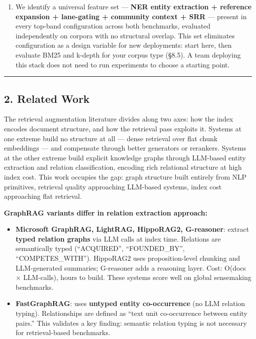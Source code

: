 \begin{enumerate}
\item
  We identify a universal feature set --- \textbf{NER entity extraction + reference expansion + lane-gating + community context + SRR} --- present in every top-band configuration across both benchmarks, evaluated independently on corpora with no structural overlap. This set eliminates configuration as a design variable for new deployments: start here, then evaluate BM25 and k-depth for your corpus type (§8.5). A team deploying this stack does not need to run experiments to choose a starting point.
\end{enumerate}

\begin{center}\rule{0.5\linewidth}{0.5pt}\end{center}

\subsection{2. Related Work}\label{related-work}

The retrieval augmentation literature divides along two axes: how the index encodes document structure, and how the retrieval pass exploits it. Systems at one extreme build no structure at all --- dense retrieval over flat chunk embeddings --- and compensate through better generators or rerankers. Systems at the other extreme build explicit knowledge graphs through LLM-based entity extraction and relation classification, encoding rich relational structure at high index cost. This work occupies the gap: graph structure built entirely from NLP primitives, retrieval quality approaching LLM-based systems, index cost approaching flat retrieval.

\textbf{GraphRAG variants differ in relation extraction approach:}

\begin{itemize}
\tightlist
\item
  \textbf{Microsoft GraphRAG, LightRAG, HippoRAG2, G-reasoner}: extract \textbf{typed relation graphs} via LLM calls at index time. Relations are semantically typed (``ACQUIRED'', ``FOUNDED\_BY'', ``COMPETES\_WITH''). HippoRAG2 uses proposition-level chunking and LLM-generated summaries; G-reasoner adds a reasoning layer. Cost: O(docs × LLM-calls), hours to build. These systems score well on global sensemaking benchmarks.
\item
  \textbf{FastGraphRAG}: uses \textbf{untyped entity co-occurrence} (no LLM relation typing). Relationships are defined as ``text unit co-occurrence between entity pairs.'' This validates a key finding: semantic relation typing is not necessary for retrieval-based benchmarks.
\end{itemize}

